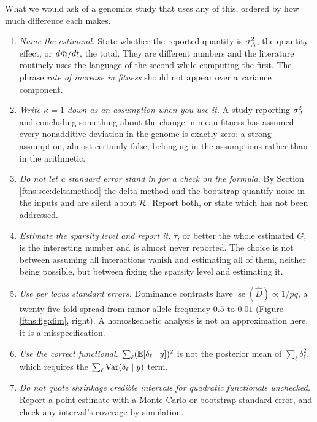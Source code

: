 What we would ask of a genomics study that uses any of this, ordered by how much difference each
makes.

\begin{enumerate}
\item \emph{Name the estimand.} State whether the reported quantity is $\sigma^{2}_{A}$, the quantity
effect, or $d\bar{m}/dt$, the total. They are different numbers and the literature routinely uses the
language of the second while computing the first. The phrase \emph{rate of increase in fitness}
should not appear over a variance component.

\item \emph{Write $\kappa=1$ down as an assumption when you use it.} A study reporting $\sigma^{2}_{A}$ and
concluding something about the change in mean fitness has assumed every nonadditive deviation in
the genome is exactly zero: a strong assumption, almost certainly false, belonging in the
assumptions rather than in the arithmetic.

\item \emph{Do not let a standard error stand in for a check on the formula.} By
Section \ref{ftns:sec:deltamethod} the delta method and the bootstrap quantify noise in the inputs and
are silent about $\mathcal{R}$. Report both, or state which has not been addressed.

\item \emph{Estimate the sparsity level and report it.} $\hat\tau$, or better the whole estimated
$G$, is the interesting number and is almost never reported. The choice is not between assuming all
interactions vanish and estimating all of them, neither being possible, but between fixing the
sparsity level and estimating it.

\item \emph{Use per locus standard errors.} Dominance contrasts have
$\operatorname{se}(\hat D)\propto1/pq$, a twenty five fold spread from minor allele frequency $0.5$
to $0.01$ (Figure \ref{ftns:fig:dim}, right). A homoskedastic analysis is not an approximation here, it
is a misspecification.

\item \emph{Use the correct functional.} $\sum_\ell(\mathbb{E}[\delta_\ell\mid y])^2$ is not the posterior
mean of $\sum_\ell\delta^2_\ell$, which requires the $\sum_\ell\operatorname{Var}(\delta_\ell\mid y)$ term.

\item \emph{Do not quote shrinkage credible intervals for quadratic functionals unchecked.} Report a
point estimate with a Monte Carlo or bootstrap standard error, and check any interval's coverage
by simulation.


\end{enumerate}
